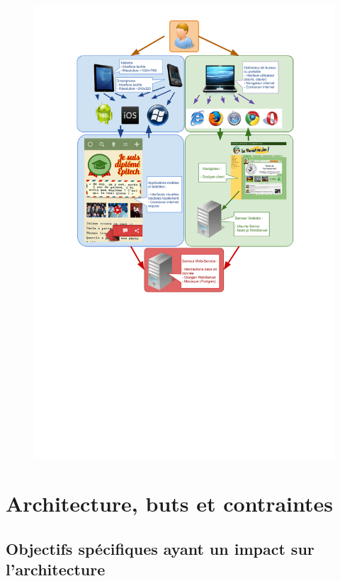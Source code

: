 \documentclass{life-fr}
\begin{document}
\begin{figure}[H]
  \begin{center}
    \includegraphics[width=17cm]{img/intro.png}
  \end{center}
\end{figure} 


\chapter{Architecture, buts et contraintes}
\section{Objectifs spécifiques ayant un impact sur l’architecture}
\end{document}
